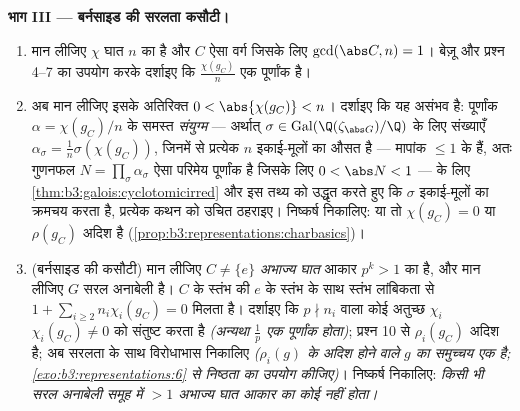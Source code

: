 \begin{problem}[{सप्ताहांत समस्या --- क्रम $p^aq^b$ के समूहों की
विलेयता}]
\medskip
\noindent\textbf{भाग III --- बर्नसाइड की सरलता कसौटी।}
\begin{enumerate}[resume]
  \item मान लीजिए $\chi$ घात $n$ का  है और $C$ ऐसा वर्ग
        जिसके लिए $\gcd(\abs C, n) = 1$। बेज़ू और प्रश्न 4--7 का उपयोग करके
        दर्शाइए कि $\frac{\chi(g_C)}{n}$ एक  पूर्णांक है।
  \item अब मान लीजिए इसके अतिरिक्त $0 < \abs{\chi(g_C)} < n$। दर्शाइए कि यह असंभव है:
         पूर्णांक $\alpha =
        \chi(g_C)/n$ के समस्त \emph{संयुग्म} --- अर्थात्
        $\sigma \in \operatorname{Gal}(\Q(\zeta_{\abs G})/\Q)$ के लिए संख्याएँ $\alpha_\sigma = \frac1n\sigma(\chi(g_C))$, जिनमें से प्रत्येक $n$
        इकाई-मूलों का औसत है --- मापांक $\leq 1$ के हैं, अतः गुणनफल
        $N = \prod_\sigma\alpha_\sigma$ ऐसा परिमेय  पूर्णांक है जिसके लिए $0 < \abs N < 1$ ---
         के लिए \cref{thm:b3:galois:cyclotomicirred} और इस तथ्य को उद्धृत करते हुए कि
        $\sigma$ इकाई-मूलों का क्रमचय करता है, प्रत्येक कथन को उचित
        ठहराइए। निष्कर्ष निकालिए: या तो $\chi(g_C) = 0$ या $\rho(g_C)$ अदिश है
        (\cref{prop:b3:representations:charbasics})।
  \item (बर्नसाइड की कसौटी) मान लीजिए $C \neq \{e\}$ \emph{अभाज्य घात}
        आकार $p^k > 1$ का  है, और मान लीजिए $G$ सरल
        अनाबेली है। $C$ के स्तंभ की $e$ के स्तंभ के साथ स्तंभ
        लांबिकता से $1 + \sum_{i \geq 2} n_i\chi_i(g_C) = 0$ मिलता है। दर्शाइए कि $p \nmid n_i$ वाला कोई
        अतुच्छ $\chi_i$ $\chi_i(g_C) \neq 0$ को संतुष्ट करता है \emph{(अन्यथा
        $\frac1p$ एक  पूर्णांक होता)}; प्रश्न 10 से $\rho_i(g_C)$ अदिश
        है; अब सरलता के साथ विरोधाभास निकालिए \emph{($\rho_i(g)$ के
        अदिश होने वाले $g$ का समुच्चय एक  है;
        \cref{exo:b3:representations:6} से निष्ठता का उपयोग कीजिए)}। निष्कर्ष निकालिए:
        \emph{किसी भी सरल अनाबेली समूह में $> 1$ अभाज्य घात आकार
        का कोई  नहीं होता।}
\end{enumerate}


\end{problem}
